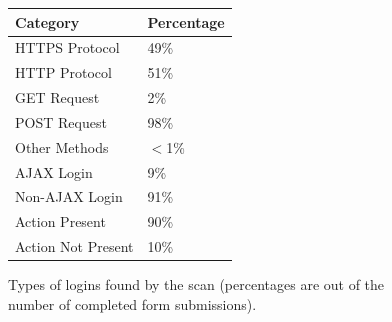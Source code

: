 \documentclass[sigconf, anonymous]{acmart}
\begin{document}
\begin{figure}[h]
\begin{center}
\begin{tabular}{ |p{5cm}|p{2cm}|  }

 \hline
Category &Percentage\\
 \hline
 HTTPS Protocol & 49\% \\
 HTTP Protocol & 51\% \\
 GET Request & 2\% \\
 POST Request & 98\%\\
 Other Methods & $<$1\% \\
 AJAX Login & 9\% \\
 Non-AJAX Login & 91\% \\
 Action Present & 90\% \\
 Action Not Present & 10\% \\


 \hline
\end{tabular}

\end{center}
\caption{Types of logins found by the scan (percentages are out of the number of completed form submissions).}
\label{scan_results_table}
\end{figure}

\makeatletter
\def\url@leostyle{%
  \@ifundefined{selectfont}{\def\UrlFont{\sf}}{\def\UrlFont{\scriptsize\sffamily}}}
\makeatother


 
\end{document}
